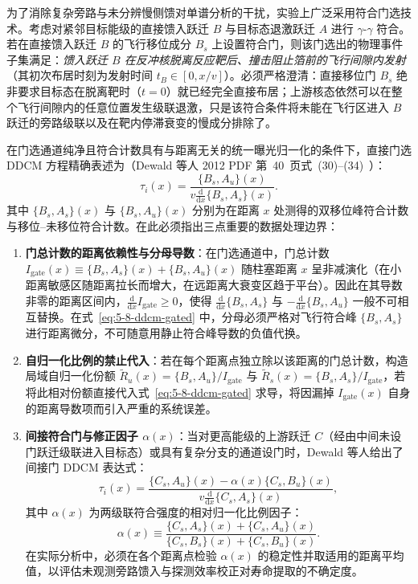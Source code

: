 为了消除复杂旁路与未分辨慢侧馈对单谱分析的干扰，实验上广泛采用符合门选技术。考虑对紧邻目标能级的直接馈入跃迁 $B$ 与目标态退激跃迁 $A$ 进行 $\gamma$-$\gamma$ 符合。若在直接馈入跃迁 $B$ 的飞行移位成分 $B_s$ 上设置符合门，则该门选出的物理事件子集满足：\emph{馈入跃迁 $B$ 在反冲核脱离反应靶后、撞击阻止箔前的飞行间隙内发射}（其初次布居时刻为发射时间 $t_B \in [0, x/v]$）。必须严格澄清：直接移位门 $B_s$ 绝非要求目标态在脱离靶时（$t=0$）就已经完全直接布居；上游核态依然可以在整个飞行间隙内的任意位置发生级联退激，只是该符合条件将未能在飞行区进入 $B$ 跃迁的旁路级联以及在靶内停滞衰变的慢成分排除了。

在门选通道纯净且符合计数具有与距离无关的统一曝光归一化的条件下，直接门选 DDCM 方程精确表述为（Dewald 等人 2012 PDF 第~40~页式~(30)–(34)~\cite{dewald-2012-ddcm-recoil-distance}）：
\begin{equation}\label{eq:5-8-ddcm-gated}
\tau_i(x) = \frac{\{B_s, A_u\}(x)}{v \frac{\mathrm{d}}{\mathrm{d}x} \{B_s, A_s\}(x)}.
\end{equation}
其中 $\{B_s, A_s\}(x)$ 与 $\{B_s, A_u\}(x)$ 分别为在距离 $x$ 处测得的双移位峰符合计数与移位--未移位符合计数。在此必须指出三点重要的数据处理边界：
\begin{enumerate}
\item \textbf{门总计数的距离依赖性与分母导数}：在门选通道中，门总计数 $I_{\mathrm{gate}}(x) \equiv \{B_s, A_s\}(x) + \{B_s, A_u\}(x)$ 随柱塞距离 $x$ 呈非减演化（在小距离敏感区随距离拉长而增大，在远距离大衰变区趋于平台）。因此在其导数非零的距离区间内，$\frac{\mathrm{d}}{\mathrm{d}x} I_{\mathrm{gate}} \ge 0$，使得 $\frac{\mathrm{d}}{\mathrm{d}x} \{B_s, A_s\}$ 与 $-\frac{\mathrm{d}}{\mathrm{d}x} \{B_s, A_u\}$ 一般不可相互替换。在式~\eqref{eq:5-8-ddcm-gated} 中，分母必须严格对飞行符合峰 $\{B_s, A_s\}$ 进行距离微分，不可随意用静止符合峰导数的负值代换。
\item \textbf{自归一化比例的禁止代入}：若在每个距离点独立除以该距离的门总计数，构造局域自归一化份额 $\widetilde{R}_u(x) = \{B_s, A_u\}/I_{\mathrm{gate}}$ 与 $\widetilde{R}_s(x) = \{B_s, A_s\}/I_{\mathrm{gate}}$，若将此相对份额直接代入式~\eqref{eq:5-8-ddcm-gated} 求导，将因漏掉 $I_{\mathrm{gate}}(x)$ 自身的距离导数项而引入严重的系统误差。
\item \textbf{间接符合门与修正因子 $\alpha(x)$}：当对更高能级的上游跃迁 $C$（经由中间未设门跃迁级联进入目标态）或具有复杂分支的通道设门时，Dewald 等人给出了间接门 DDCM 表达式：
\begin{equation}\label{eq:5-8-ddcm-indirect}
\tau_i(x) = \frac{\{C_s, A_u\}(x) - \alpha(x) \{C_s, B_u\}(x)}{v \frac{\mathrm{d}}{\mathrm{d}x} \{C_s, A_s\}(x)},
\end{equation}
其中 $\alpha(x)$ 为两级联符合强度的相对归一化比例因子：
\begin{equation}\label{eq:5-8-alpha-def}
\alpha(x) \equiv \frac{\{C_s, A_s\}(x) + \{C_s, A_u\}(x)}{\{C_s, B_s\}(x) + \{C_s, B_u\}(x)}.
\end{equation}
在实际分析中，必须在各个距离点检验 $\alpha(x)$ 的稳定性并取适用的距离平均值，以评估未观测旁路馈入与探测效率校正对寿命提取的不确定度。
\end{enumerate}

